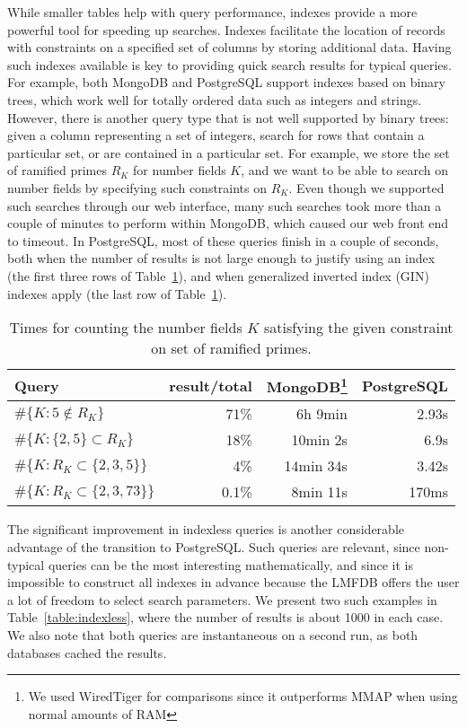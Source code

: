 \documentclass{amsart}
\begin{document}
While smaller tables help with query performance, indexes provide a more powerful tool for speeding up searches.
Indexes facilitate the location of records with constraints on a specified set of columns by storing additional data.
Having such indexes available is key to providing quick search results for typical queries.
For example, both MongoDB and PostgreSQL support indexes based on binary trees, which work well for totally ordered data such as integers and strings.
However, there is another query type that is not well supported by binary trees: given a column representing a set of integers, search for rows that contain a particular set, or are contained in a particular set.
For example, we store the set of ramified primes $R_K$ for number fields $K$, and we want to be able to search on number fields by specifying such constraints on $R_K$.
Even though we supported such searches through our web interface, many such searches took more than a couple of minutes to perform within MongoDB, which caused our web front end to timeout.
In PostgreSQL, most of these queries finish in a couple of seconds, both when the number of results is not large enough to justify using an index (the first three rows of Table~\ref{table:ramps}), and when generalized inverted index (GIN)\cite{gin} indexes apply (the last row of Table~\ref{table:ramps}).
\begin{table}[h!]
  \begin{center}
  \begin{tabular}{l|r|r|r}
    Query & result/total & MongoDB\footnote{We used WiredTiger for comparisons since it outperforms MMAP when using normal amounts of RAM} & PostgreSQL\\
\hline
$\#\{K : 5 \notin R_K \}$ & 71\% & 6h 9min & 2.93s \\
$\#\{K : \{2, 5\} \subset R_K\}$ & 18\% &10min 2s & 6.9s\\
$\#\{K: R_K \subset \{2, 3, 5\} \}$ & 4\% & 14min 34s & 3.42s\\
$\#\{K: R_K \subset \{2, 3, 73\} \}$ & 0.1\% & 8min 11s & 170ms
\end{tabular}
\caption{Times for counting the number fields $K$ satisfying the given constraint on set of ramified primes.}
\label{table:ramps}
\end{center}
\end{table}


The significant improvement in indexless queries is another considerable advantage of the transition to PostgreSQL.
Such queries are relevant, since non-typical queries can be the most interesting mathematically, and since it is impossible to construct all indexes in advance because the LMFDB offers the user a lot of freedom to select search parameters.
We present two such examples in Table~\ref{table:indexless}, where the number of results is about 1000 in each case.
We also note that both queries are instantaneous on a second run, as both databases cached the results.
\end{document}
